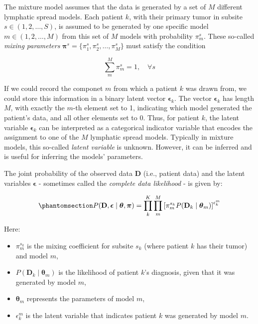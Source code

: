 \documentclass[
  sn-mathphys-num,
]{sn-jnl}
\providecommand{\tightlist}{%
  \setlength{\itemsep}{0pt}\setlength{\parskip}{0pt}}\usepackage{longtable,booktabs,array}
\begin{document}
The mixture model assumes that the data is generated by a set of \(M\)
different lymphatic spread models. Each patient \(k\), with their
primary tumor in subsite \(s \in (1, 2, \ldots, S)\), is assumed to be
generated by one specific model \(m \in (1, 2, \ldots, M)\) from this
set of \(M\) models with probability \(\pi_m^s\). These so-called
\emph{mixing parameters}
\(\boldsymbol{\pi}^s = \{\pi_1^s, \pi_2^s, \dots, \pi_M^s\}\) must
satisfy the condition

\[
\sum_{m}^M \pi_m^s = 1, \quad \forall s
\]

If we could record the componet \(m\) from which a patient \(k\) was
drawn from, we could store this information in a binary latent vector
\(\boldsymbol{\epsilon}_k\). The vector \(\boldsymbol{\epsilon}_k\) has
length \(M\), with exactly the \(m\)-th element set to 1, indicating
which model generated the patient's data, and all other elements set to
0. Thus, for patient \(k\), the latent variable
\(\boldsymbol{\epsilon}_k\) can be interpreted as a categorical
indicator variable that encodes the assignment to one of the \(M\)
lymphatic spread models. Typically in mixture models, this so-called
\emph{latent variable} is unknown. However, it can be inferred and is
useful for inferring the models' parameters.

The joint probability of the observed data \(\mathbf{D}\) (i.e., patient
data) and the latent variables \(\boldsymbol{\epsilon}\) - sometimes
called the \emph{complete data likelihood} - is given by:

\begin{equation}\phantomsection\label{eq-complete-likelihood}{
P(\mathbf{D}, \boldsymbol{\epsilon} \mid \boldsymbol{\theta}, \boldsymbol{\pi}) = \prod_{k}^{K} \prod_{m}^{M} \left[ \pi_m^{s_k} P(\mathbf{D}_k \mid \boldsymbol{\theta}_m) \right]^{\epsilon_{k}^m}
}\end{equation}

Here:

\begin{itemize}
\tightlist
\item
  \(\pi_m^{s_k}\) is the mixing coefficient for subsite \(s_k\) (where
  patient \(k\) has their tumor) and model \(m\),
\item
  \(P(\mathbf{D}_k \mid \boldsymbol{\theta}_m)\) is the likelihood of
  patient \(k\)'s diagnosis, given that it was generated by model \(m\),
\item
  \(\boldsymbol{\theta}_m\) represents the parameters of model \(m\),
\item
  \(\epsilon_{k}^m\) is the latent variable that indicates patient \(k\)
  was generated by model \(m\).
\end{itemize}
\end{document}
